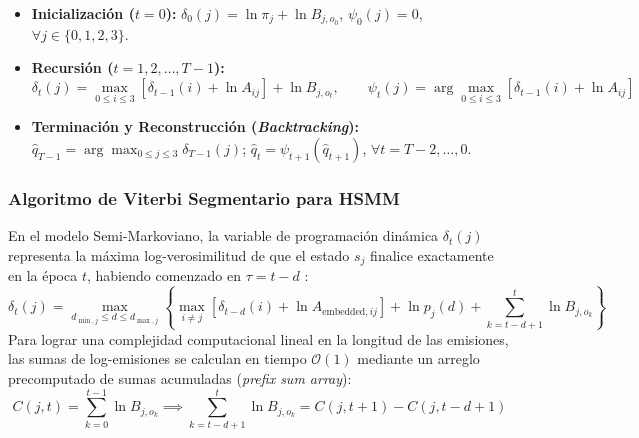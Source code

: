 \documentclass[11pt,a4paper]{article}
\begin{document}
\begin{itemize}[leftmargin=*,itemsep=1pt]
    \item \textbf{Inicialización ($t = 0$):} $\delta_0(j) = \ln \pi_j + \ln B_{j, o_0}$, $\psi_0(j) = 0$, $\forall j \in \{0, 1, 2, 3\}$.
    \item \textbf{Recursión ($t = 1, 2, \dots, T-1$):}
    \begin{equation}
        \delta_t(j) = \max_{0 \le i \le 3} \left[ \delta_{t-1}(i) + \ln A_{ij} \right] + \ln B_{j, o_t}, \qquad \psi_t(j) = \arg\max_{0 \le i \le 3} \left[ \delta_{t-1}(i) + \ln A_{ij} \right]
    \end{equation}
    \item \textbf{Terminación y Reconstrucción (\textit{Backtracking}):} $\hat{q}_{T-1} = \arg\max_{0 \le j \le 3} \delta_{T-1}(j)$; $\hat{q}_t = \psi_{t+1}(\hat{q}_{t+1})$, $\forall t = T-2, \dots, 0$.
\end{itemize}

\subsubsection{Algoritmo de Viterbi Segmentario para HSMM}
En el modelo Semi-Markoviano, la variable de programación dinámica $\delta_t(j)$ representa la máxima log-verosimilitud de que el estado $s_j$ finalice exactamente en la época $t$, habiendo comenzado en $\tau = t - d$ \cite{ferguson1980, yu2010}:
\begin{equation}
    \delta_t(j) = \max_{d_{\min, j} \le d \le d_{\max, j}} \left\{ \max_{i \ne j} \left[ \delta_{t-d}(i) + \ln A_{\text{embedded}, ij} \right] + \ln p_j(d) + \sum_{k=t-d+1}^t \ln B_{j, o_k} \right\}
\end{equation}
Para lograr una complejidad computacional lineal en la longitud de las emisiones, las sumas de log-emisiones se calculan en tiempo $\mathcal{O}(1)$ mediante un arreglo precomputado de sumas acumuladas (\textit{prefix sum array}):
\begin{equation}
    C(j, t) = \sum_{k=0}^{t-1} \ln B_{j, o_k} \implies \sum_{k=t-d+1}^t \ln B_{j, o_k} = C(j, t+1) - C(j, t-d+1)
\end{equation}
\end{document}
